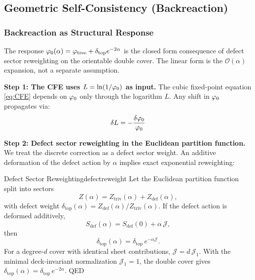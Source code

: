 \subsection{Geometric Self-Consistency (Backreaction)}

\subsubsection{Backreaction as Structural Response}

The response $\varphi_0(\alpha) = \varphi_{\mathrm{tree}} + \delta_{\mathrm{top}} e^{-2\alpha}$ is the closed form
consequence of defect sector reweighting on the orientable double cover. The linear form
is the $\mathcal{O}(\alpha)$ expansion, not a separate assumption.

\textbf{Step 1: The CFE uses $L = \ln(1/\varphi_0)$ as input.}
The cubic fixed-point equation \eqref{eq:CFE} depends on $\varphi_0$ only through 
the logarithm $L$. Any shift in $\varphi_0$ propagates via:
\begin{equation}
    \delta L = -\frac{\delta\varphi_0}{\varphi_0}
\end{equation}

\textbf{Step 2: Defect sector reweighting in the Euclidean partition function.}
We treat the discrete correction as a defect sector weight. An additive deformation of the
defect action by $\alpha$ implies exact exponential reweighting:
\begin{lemma}{Defect Sector Reweighting}{defectreweight}
Let the Euclidean partition function split into sectors
\begin{equation}
    Z(\alpha)=Z_{\mathrm{triv}}(\alpha)+Z_{\mathrm{def}}(\alpha),
\end{equation}
with defect weight $\delta_{\mathrm{top}}(\alpha)=Z_{\mathrm{def}}(\alpha)/Z_{\mathrm{triv}}(\alpha)$.
If the defect action is deformed additively,
\begin{equation}
    S_{\mathrm{def}}(\alpha)=S_{\mathrm{def}}(0)+\alpha\,\mathcal{J},
\end{equation}
then
\begin{equation}
    \delta_{\mathrm{top}}(\alpha)=\delta_{\mathrm{top}}\,e^{-\alpha\mathcal{J}}.
\end{equation}
For a degree-$d$ cover with identical sheet contributions, $\mathcal{J}=d\,\mathcal{J}_1$.
With the minimal deck-invariant normalization $\mathcal{J}_1=1$, the double cover gives
$\delta_{\mathrm{top}}(\alpha)=\delta_{\mathrm{top}}\,e^{-2\alpha}$. \hfill QED
\end{lemma}

